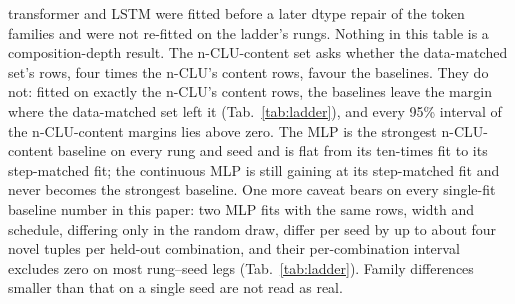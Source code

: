 \documentclass{article} %
\begin{document}
transformer and LSTM were fitted before a later dtype repair of the
token families and were not re-fitted on the ladder's rungs. Nothing in this table is a
composition-depth result.
The n-CLU-content set asks whether the data-matched set's rows, four times the n-CLU's
content rows, favour the baselines. They do not: fitted on exactly the n-CLU's content rows, %
the baselines leave the margin where the data-matched set left it %
(Tab.~\ref{tab:ladder}), %
and every 95\% interval of the n-CLU-content %
margins lies above zero. %
The MLP is the strongest n-CLU-content baseline on every rung and seed and is flat from its ten-times fit to its %
step-matched fit; the continuous MLP is still gaining at its step-matched fit and never becomes the strongest %
baseline. One more caveat bears on every single-fit baseline number in this paper: two MLP fits with the
same rows, width and schedule, differing only in the random draw, differ per seed by %
up to about four novel tuples per held-out combination, and their per-combination interval excludes zero on most %
rung--seed legs (Tab.~\ref{tab:ladder}). Family differences smaller than that on a single seed are not read as real.
\end{document}
